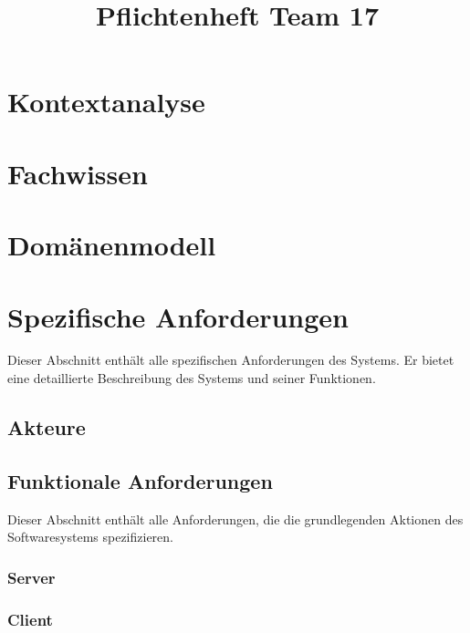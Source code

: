 \documentclass{uulm-assignment}
\title{Pflichtenheft Team 17}
\begin{document}
\maketitle

\tableofcontents

\clearpage
\section{Kontextanalyse}


\clearpage
\section{Fachwissen}


\clearpage
\section{Domänenmodell}


\clearpage
\section{Spezifische Anforderungen}
Dieser Abschnitt enthält alle spezifischen Anforderungen des Systems. Er bietet eine detaillierte
Beschreibung des Systems und seiner Funktionen.


\subsection{Akteure}


\clearpage
\subsection{Funktionale Anforderungen}

Dieser Abschnitt enthält alle Anforderungen, die die grundlegenden Aktionen des Softwaresystems
spezifizieren.

\subsubsection{Server}



\clearpage
\subsubsection{Client}

\end{document}
